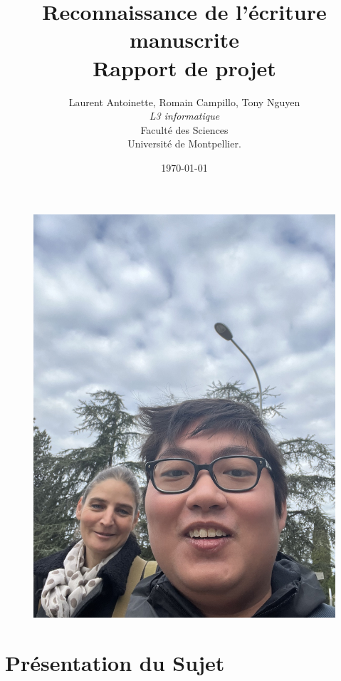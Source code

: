 \documentclass[a4paper]{article}
\begin{document}
	\title{Reconnaissance de l'écriture manuscrite\\Rapport de projet}
	\author{Laurent Antoinette, Romain Campillo, Tony Nguyen\\\emph{L3 informatique}\\
	Faculté des Sciences\\
	Université de Montpellier.}
	\date{\today}
	\maketitle
	\thispagestyle{empty}
	\begin{figure}[h]
		\includegraphics[scale=.1]{selfie_tony_clementine.jpg}
		\centering
	\end{figure}
	\newpage
	\thispagestyle{empty}
	\tableofcontents
	\newpage
	\thispagestyle{empty}
	\listoffigures
	\listofalgorithms
	\newpage
	\section{Présentation du Sujet } 
\end{document}
